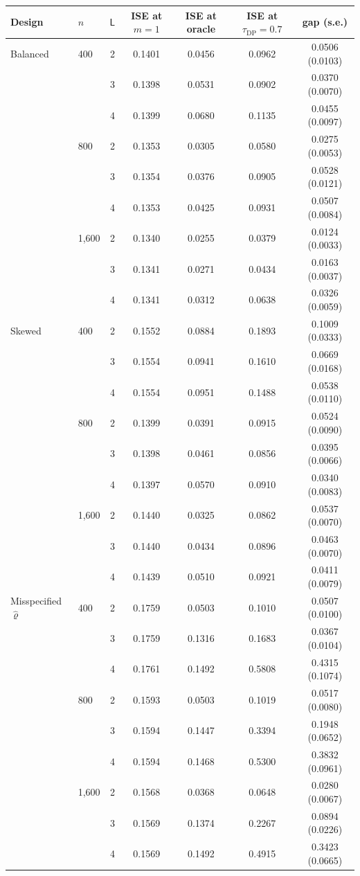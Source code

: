 \begin{tabular}{llccccc}
\toprule
Design & $n$ & $\mathsf L$ & ISE at $m=1$ & ISE at oracle & ISE at $\tau_{\mathrm{DP}}=0.7$ & gap (s.e.) \\
\midrule
Balanced & 400 & 2 & 0.1401 & 0.0456 & 0.0962 & 0.0506 (0.0103) \\
 &  & 3 & 0.1398 & 0.0531 & 0.0902 & 0.0370 (0.0070) \\
 &  & 4 & 0.1399 & 0.0680 & 0.1135 & 0.0455 (0.0097) \\
 & 800 & 2 & 0.1353 & 0.0305 & 0.0580 & 0.0275 (0.0053) \\
 &  & 3 & 0.1354 & 0.0376 & 0.0905 & 0.0528 (0.0121) \\
 &  & 4 & 0.1353 & 0.0425 & 0.0931 & 0.0507 (0.0084) \\
 & 1,600 & 2 & 0.1340 & 0.0255 & 0.0379 & 0.0124 (0.0033) \\
 &  & 3 & 0.1341 & 0.0271 & 0.0434 & 0.0163 (0.0037) \\
 &  & 4 & 0.1341 & 0.0312 & 0.0638 & 0.0326 (0.0059) \\
\addlinespace
Skewed & 400 & 2 & 0.1552 & 0.0884 & 0.1893 & 0.1009 (0.0333) \\
 &  & 3 & 0.1554 & 0.0941 & 0.1610 & 0.0669 (0.0168) \\
 &  & 4 & 0.1554 & 0.0951 & 0.1488 & 0.0538 (0.0110) \\
 & 800 & 2 & 0.1399 & 0.0391 & 0.0915 & 0.0524 (0.0090) \\
 &  & 3 & 0.1398 & 0.0461 & 0.0856 & 0.0395 (0.0066) \\
 &  & 4 & 0.1397 & 0.0570 & 0.0910 & 0.0340 (0.0083) \\
 & 1,600 & 2 & 0.1440 & 0.0325 & 0.0862 & 0.0537 (0.0070) \\
 &  & 3 & 0.1440 & 0.0434 & 0.0896 & 0.0463 (0.0070) \\
 &  & 4 & 0.1439 & 0.0510 & 0.0921 & 0.0411 (0.0079) \\
\addlinespace
Misspecified $\hat\varrho$ & 400 & 2 & 0.1759 & 0.0503 & 0.1010 & 0.0507 (0.0100) \\
 &  & 3 & 0.1759 & 0.1316 & 0.1683 & 0.0367 (0.0104) \\
 &  & 4 & 0.1761 & 0.1492 & 0.5808 & 0.4315 (0.1074) \\
 & 800 & 2 & 0.1593 & 0.0503 & 0.1019 & 0.0517 (0.0080) \\
 &  & 3 & 0.1594 & 0.1447 & 0.3394 & 0.1948 (0.0652) \\
 &  & 4 & 0.1594 & 0.1468 & 0.5300 & 0.3832 (0.0961) \\
 & 1,600 & 2 & 0.1568 & 0.0368 & 0.0648 & 0.0280 (0.0067) \\
 &  & 3 & 0.1569 & 0.1374 & 0.2267 & 0.0894 (0.0226) \\
 &  & 4 & 0.1569 & 0.1492 & 0.4915 & 0.3423 (0.0665) \\
\bottomrule
\end{tabular}
